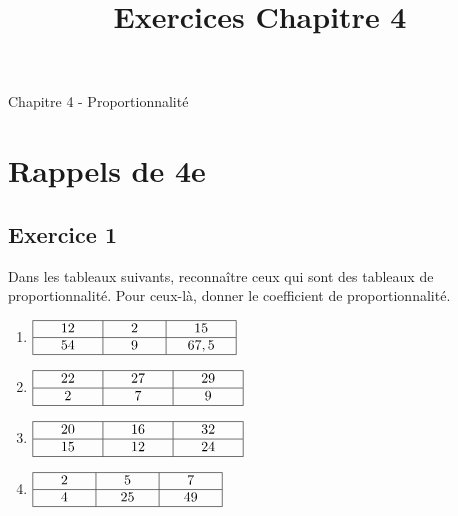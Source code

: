 \documentclass[12 pt]{extarticle}
\title{Exercices Chapitre 4}
\date{}
\theoremstyle{plain}
\begin{document}
\begin{center}{\Large Chapitre 4 - Proportionnalité}\\
 \end{center} 
\section{Rappels de 4e}
\subsection*{Exercice 1}

Dans les tableaux suivants, reconnaître ceux qui sont des tableaux de proportionnalité. Pour ceux-là, donner le coefficient de proportionnalité. 

\begin{enumerate}
\item $
\begin{array}{|c|c|c|}
\hline
\phantom{000}    12    \phantom{000} 
& \phantom{000}    2   \phantom{000} & 
\phantom{000}
15
\phantom{000}\\
\hline

54 & 9  & 67,5\\
\hline
\end{array}$

\item $
\begin{array}{|c|c|c|}
\hline
\phantom{000}    22   \phantom{000} 
& \phantom{000}   27    \phantom{000} & 
\phantom{000}29
\phantom{000}\\
\hline
2 &7  & 9\\
\hline
\end{array}$

\item $
\begin{array}{|c|c|c|}
\hline
\phantom{000}    20    \phantom{000} 
& \phantom{000}     16  \phantom{000} & 
\phantom{000}
32
\phantom{000}\\
\hline

 15 & 12 & 24 \\
\hline
\end{array}$

\item $
\begin{array}{|c|c|c|}
\hline
\phantom{000}    2    \phantom{000} 
& \phantom{000}     5  \phantom{000} & 
\phantom{000}
7
\phantom{000}\\
\hline

4 & 25 & 49 \\
\hline
\end{array}$


\end{enumerate}
\end{document}
